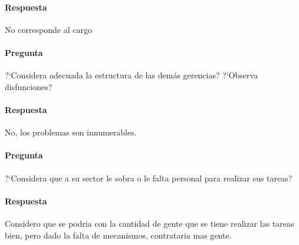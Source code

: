 \documentclass[12pt,a4paper,spanish]{article}
\begin{document}
	\paragraph{Respuesta}
No corresponde al cargo

	\paragraph{Pregunta}
	 ?`Considera adecuada la estructura de las dem\'as gerencias?  ?`Observa disfunciones?
	\paragraph{Respuesta}
No, los problemas son innumerables.

	\paragraph{Pregunta}
	 ?`Considera que a su sector le sobra o le falta personal para realizar sus tareas?
	\paragraph{Respuesta}
	Considero que se podria con la cantidad de gente que se tiene realizar las tareas bien, pero dado la falta de mecanismos, contrataria mas gente.
\end{document}
